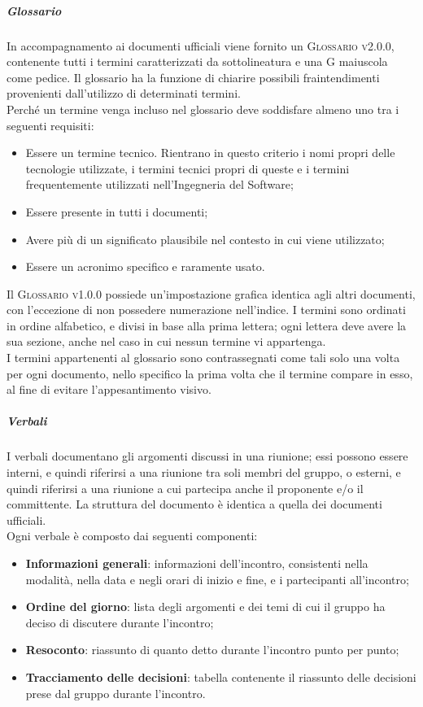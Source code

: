 \documentclass[../norme-di-progetto.tex]{subfiles}
\begin{document}
\subparagraph*{Glossario}
In accompagnamento ai documenti ufficiali viene fornito un \textsc{Glossario v2.0.0}, contenente tutti i termini caratterizzati da sottolineatura e una G maiuscola come pedice. Il glossario ha la funzione di chiarire possibili fraintendimenti provenienti dall'utilizzo di determinati termini. \\
Perché un termine venga incluso nel glossario deve soddisfare almeno uno tra i seguenti requisiti:
\begin{itemize}
  \item Essere un termine tecnico. Rientrano in questo criterio i nomi propri delle tecnologie utilizzate, i termini tecnici propri di queste e i termini frequentemente utilizzati nell'Ingegneria del Software;
  \item Essere presente in tutti i documenti;
  \item Avere più di un significato plausibile nel contesto in cui viene utilizzato;
  \item Essere un acronimo specifico e raramente usato.
\end{itemize}
Il \textsc{Glossario v1.0.0} possiede un'impostazione grafica identica agli altri documenti, con l'eccezione di non possedere numerazione nell'indice. I termini sono ordinati in ordine alfabetico, e divisi in base alla prima lettera; ogni lettera deve avere la sua sezione, anche nel caso in cui nessun termine vi appartenga. \\
I termini appartenenti al glossario sono contrassegnati come tali solo una volta per ogni documento, nello specifico la prima volta che il termine compare in esso, al fine di evitare l'appesantimento visivo.

\subparagraph*{Verbali}
I verbali documentano gli argomenti discussi in una riunione; essi possono essere interni, e quindi riferirsi a una riunione tra soli membri del gruppo, o esterni, e quindi riferirsi a una riunione a cui partecipa anche il proponente e/o il committente. La struttura del documento è identica a quella dei documenti ufficiali. \\
Ogni verbale è composto dai seguenti componenti:
\begin{itemize}
  \item \textbf{Informazioni generali}: informazioni dell'incontro, consistenti nella modalità, nella data e negli orari di inizio e fine, e i partecipanti all'incontro;
  \item \textbf{Ordine del giorno}: lista degli argomenti e dei temi di cui il gruppo ha deciso di discutere durante l'incontro;
  \item \textbf{Resoconto}: riassunto di quanto detto durante l'incontro punto per punto;
  \item \textbf{Tracciamento delle decisioni}: tabella contenente il riassunto delle decisioni prese dal gruppo durante l'incontro.
\end{itemize}
\end{document}
